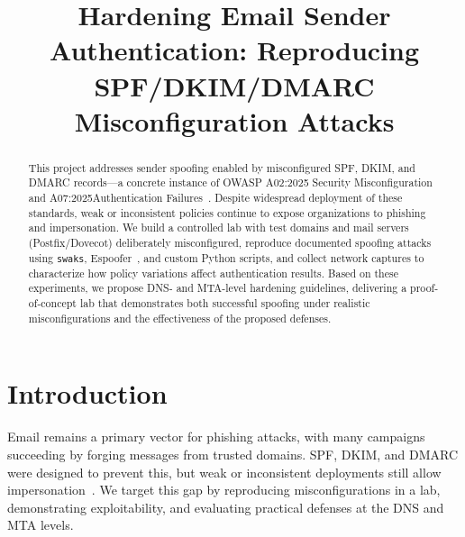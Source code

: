 \documentclass[conference, onecolumn, a4paper, 10pt]{IEEEtran}
\begin{document}
\title{Hardening Email Sender Authentication: Reproducing SPF/DKIM/DMARC Misconfiguration Attacks}

\author{
\and
{}
\and
{}
\and
{}
}

\maketitle

\begin{abstract}
This project addresses sender spoofing enabled by misconfigured SPF, DKIM, and DMARC records---a concrete instance of OWASP A02:2025 Security Misconfiguration and A07:2025Authentication Failures~\cite{owasp_a02_2025,owasp_a07_2025}. Despite widespread deployment of these standards, weak or inconsistent policies continue to expose organizations to phishing and impersonation. We build a controlled lab with test domains and mail servers (Postfix/Dovecot) deliberately misconfigured, reproduce documented spoofing attacks using \texttt{swaks}, Espoofer~\cite{chenjj_espoofer}, and custom Python scripts, and collect network captures to characterize how policy variations affect authentication results. Based on these experiments, we propose DNS- and MTA-level hardening guidelines, delivering a proof-of-concept lab that demonstrates both successful spoofing under realistic misconfigurations and the effectiveness of the proposed defenses.
\end{abstract}
 
 
\section{Introduction}
Email remains a primary vector for phishing attacks, with many campaigns succeeding by forging messages from trusted domains. SPF, DKIM, and DMARC were designed to prevent this, but weak or inconsistent deployments still allow impersonation~\cite{infraforge_spfdkimdmarc_mistakes, dmarcly_definitive_guide}. We target this gap by reproducing misconfigurations in a lab, demonstrating exploitability, and evaluating practical defenses at the DNS and MTA levels.
 
 
\end{document}
